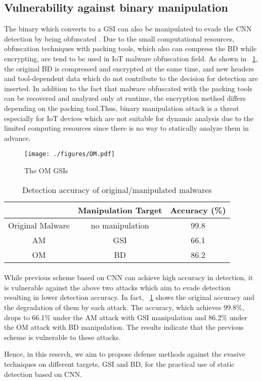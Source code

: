 \subsection{Vulnerability against binary manipulation}
The binary which converts to a GSI can also be manipulated to evade the CNN detection by being obfuscated \cite{om}.
Due to the small computational resources, obfuscation techniques with packing tools, which also can compress the BD while encrypting, are tend to be used in IoT malware obfuscation field.
As shown in \figurename~\ref{fig:omGSI}, the original BD is compressed and encrypted at the same time, and new headers and tool-dependent data which do not contribute to the decision for detection are inserted.
In addition to the fact that malware obfuscated with the packing tools can be recovered and analyzed only at runtime, the encryption method differs depending on the packing tool.Thus, binary manipulation attack is a threat especially for IoT devices which are not suitable for dynamic analysis due to the limited computing resources since there is no way to statically analyze them in advance.

\begin{figure}[p]
 \centering
 \hspace{-55pt}
 \texttt{[image: ./figures/OM.pdf]}
 \caption{The OM GSIs} 
 \label{fig:omGSI}
\end{figure}
\begin{table}[p]
  \begin{center}
    \caption{Detection accuracy of original/manipulated malwares}
    \label{tab:prev} 
    \begin{tabular}{|c|c|c|} \hline
       & Manipulation Target & Accuracy (\%) \\ \hline \hline
      Original Malware & no manipulation  & 99.8  \\ \hline
      AM & GSI & 66.1  \\ \hline 
      OM & BD & 86.2 \\ \hline
    \end{tabular}
  \end{center}
\end{table} 
\afterpage{\clearpage}
\newpage

\paragraph*{}
While previous scheme based on CNN can achieve high accuracy in detection, it is vulnerable against the above two attacks which aim to evade detection resulting in lower detection accuracy.
In fact, \tablename~\ref{tab:prev} shows the original accuracy and the degradation of them by each attack.
The accuracy, which achieves 99.8\%, drops to 66.1\% under the AM attack with GSI manipulation and 86.2\% under the OM attack with BD manipulation.
The results indicate that the previous scheme is vulnerable to these attacks.

Hence, in this reserch, we aim to propose defense methods against the evasive techniques on different targets, GSI and BD, for the practical use of static detection based on CNN.

\newpage
